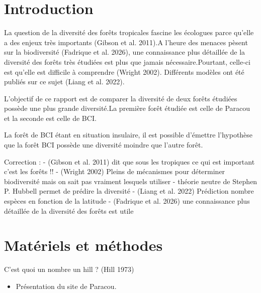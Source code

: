 \documentclass[
  french,
  11pt,
]{stylisharticle}
\affiliation{%
      \textsuperscript{1}%
      Université de Montpellier%
      , Scientific Department%
      , Somewhere%
      , City%
      , Country%
      , 9999%
    }
\providecommand{\tightlist}{%
  \setlength{\itemsep}{0pt}\setlength{\parskip}{0pt}}
\begin{document}
\flushbottom

\maketitle

\tableofcontents

\thispagestyle{empty}

\section{Introduction}\label{introduction}

La question de la diversité des forêts tropicales fascine les écologues
parce qu'elle a des enjeux très importants ({Gibson et al.} 2011).A
l'heure des menaces pèsent sur la biodiversité ({Fadrique et al.} 2026),
une connaissance plus détaillée de la diversité des forêts très étudiées
est plus que jamais nécessaire.Pourtant, celle-ci est qu'elle est
difficile à comprendre (Wright 2002). Différents modèles ont été publiés
sur ce sujet ({Liang et al.} 2022).

L'objectif de ce rapport est de comparer la diversité de deux forêts
étudiées possède une plus grande diversité.La première forêt étudiée est
celle de Paracou et la seconde est celle de BCI.

La forêt de BCI étant en situation insulaire, il est possible d'émettre
l'hypothèse que la forêt BCI possède une diversité moindre que l'autre
forêt.

Correction : - ({Gibson et al.} 2011) dit que sous les tropiques ce qui
est important c'est les forêts !! - (Wright 2002) Pleins de mécanismes
pour déterminer biodiversité mais on sait pas vraiment lesquels utiliser
- théorie neutre de Stephen P. Hubbell permet de prédire la diversité -
({Liang et al.} 2022) Prédiction nombre espèces en fonction de la
latitude - ({Fadrique et al.} 2026) une connaissance plus détaillée de
la diversité des forêts est utile

\section{Matériels et méthodes}\label{matuxe9riels-et-muxe9thodes}

C'est quoi un nombre un hill ? (Hill 1973)

\begin{itemize}
\tightlist
\item
  Présentation du site de Paracou.
\end{itemize}
\end{document}
